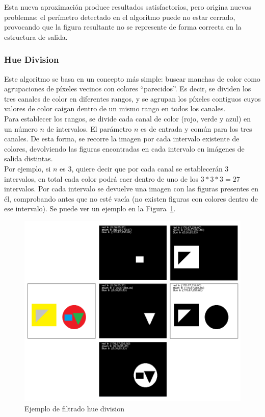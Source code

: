 {	Esta nueva aproximación produce resultados satisfactorios, pero origina nuevos problemas: el perímetro detectado en el algoritmo puede no estar cerrado, provocando que la figura resultante no se represente de forma correcta en la estructura de salida.
	
	\subsubsection{Hue Division}
	
	Este algoritmo se basa en un concepto más simple: buscar manchas de color como agrupaciones de píxeles vecinos con colores ``parecidos''. Es decir, se dividen los tres canales de color en diferentes rangos, y se agrupan los píxeles contiguos cuyos valores de color caigan dentro de un mismo rango en todos los canales.\\
	
	Para establecer los rangos, se divide cada canal de color (rojo, verde y azul) en un número $n$ de intervalos. El parámetro $n$ es de entrada y común para los tres canales. De esta forma, se recorre la imagen por cada intervalo existente de colores, devolviendo las figuras encontradas en cada intervalo en imágenes de salida distintas.\\
	
	Por ejemplo, si $n$ es 3, quiere decir que por cada canal se establecerán 3 intervalos, en total cada color podrá caer dentro de uno de los $3*3*3=27$ intervalos. Por cada intervalo se devuelve una imagen con las figuras presentes en él, comprobando antes que no esté vacía (no existen figuras con colores dentro de ese intervalo). Se puede ver un ejemplo en la Figura~\ref{fig:huedivision}.
	
		\begin{figure}[!htbp]
		\centering
		\includegraphics[scale=0.40]{graphics/huedivision.png}
		\caption{Ejemplo de filtrado hue division}
		\label{fig:huedivision}
		\end{figure}
	
}
